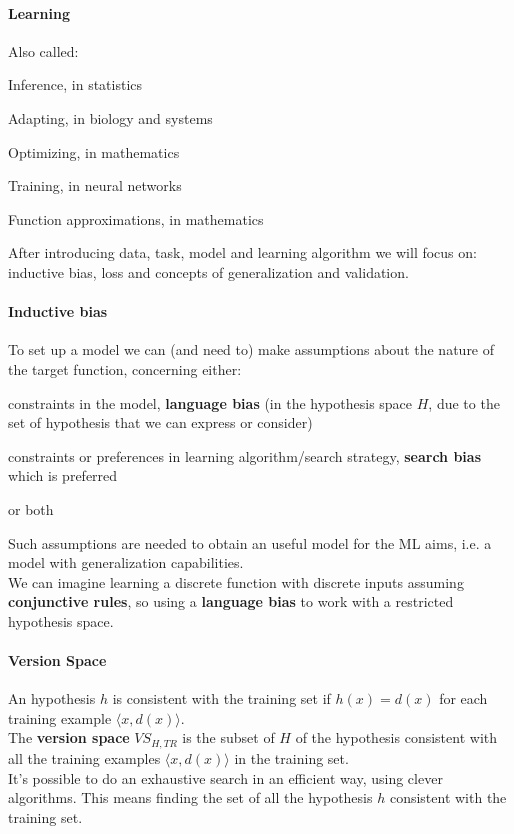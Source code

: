 \documentclass[10pt]{report}
\begin{document}
\paragraph{Learning} Also called:
\begin{list}{}{}
	\item Inference, in statistics
	\item Adapting, in biology and systems
	\item Optimizing, in mathematics
	\item Training, in neural networks
	\item Function approximations, in mathematics
\end{list}
After introducing data, task, model and learning algorithm we will focus on: inductive bias, loss and concepts of generalization and validation.
\paragraph{Inductive bias} To set up a model we can (and need to) make assumptions about the nature of the target function, concerning either:
\begin{list}{}{}
	\item constraints in the model, \textbf{language bias} (in the hypothesis space $H$, due to the set of hypothesis that we can express or consider)
	\item constraints or preferences in learning algorithm/search strategy, \textbf{search bias} which is preferred
	\item or both
\end{list}
Such assumptions are needed to obtain an useful model for the ML aims, i.e. a model with generalization capabilities.\\
We can imagine learning a discrete function with discrete inputs assuming \textbf{conjunctive rules}, so using a \textbf{language bias} to work with a restricted hypothesis space.
\paragraph{Version Space} An hypothesis $h$ is consistent with the training set if $h(x) = d(x)$ for each training example $\langle x, d(x)\rangle$.\\
The \textbf{version space} $VS_{H, TR}$ is the subset of $H$ of the hypothesis consistent with all the training examples $\langle x, d(x)\rangle$ in the training set.\\
It's possible to do an exhaustive search in an efficient way, using clever algorithms. This means finding the set of all the hypothesis $h$ consistent with the training set. 
\end{document}
